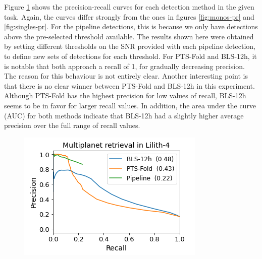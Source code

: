 Figure \ref{fig:multis-pr} shows the precision-recall curves for each detection method in the given task. Again, the curves differ strongly from the ones in figures \ref{fig:monos-pr} and \ref{fig:singles-pr}. For the pipeline detections, this is because we only have detections above the pre-selected threshold available. The results shown here were obtained by setting different thresholds on the SNR provided with each pipeline detection, to define new sets of detections for each threshold. For PTS-Fold and BLS-12h, it is notable that both approach a recall of 1, for gradually decreasing precision. The reason for this behaviour is not entirely clear. Another interesting point is that there is no clear winner between PTS-Fold and BLS-12h in this experiment. Although PTS-Fold has the highest precision for low values of recall, BLS-12h seems to be in favor for larger recall values. In addition, the area under the curve (AUC) for both methods indicate that BLS-12h had a slightly higher average precision over the full range of recall values.

\begin{figure}
    \centering
    \includegraphics[width=0.4\linewidth]{Experiments/Figures/Multis/multis_PR.png}
    \caption{ }
    \label{fig:multis-pr}
\end{figure}